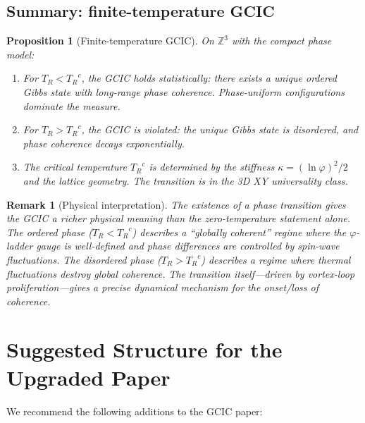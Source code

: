 \documentclass[11pt]{article}
\newtheorem{proposition}{Proposition}
\newtheorem{remark}{Remark}
\theoremstyle{definition}
\newcommand{\TR}{{T_R}}
\newcommand{\phig}{\varphi}
\begin{document}
\subsection{Summary: finite-temperature GCIC}

\begin{proposition}[Finite-temperature GCIC]
\label{prop:ft-gcic}
On $\mathbb{Z}^3$ with the compact phase model:
\begin{enumerate}[nosep]
\item For $\TR < \TR^c$, the GCIC holds \emph{statistically}: there exists a unique ordered Gibbs state with long-range phase coherence. Phase-uniform configurations dominate the measure.
\item For $\TR > \TR^c$, the GCIC is \emph{violated}: the unique Gibbs state is disordered, and phase coherence decays exponentially.
\item The critical temperature $\TR^c$ is determined by the stiffness $\kappa = (\ln\phig)^2/2$ and the lattice geometry. The transition is in the 3D XY universality class.
\end{enumerate}
\end{proposition}

\begin{remark}[Physical interpretation]
The existence of a phase transition gives the GCIC a richer physical meaning than the zero-temperature statement alone. The ordered phase ($\TR < \TR^c$) describes a ``globally coherent'' regime where the $\phig$-ladder gauge is well-defined and phase differences are controlled by spin-wave fluctuations. The disordered phase ($\TR > \TR^c$) describes a regime where thermal fluctuations destroy global coherence. The transition itself---driven by vortex-loop proliferation---gives a precise dynamical mechanism for the onset/loss of coherence.
\end{remark}


\section{Suggested Structure for the Upgraded Paper}
\label{sec:structure}

We recommend the following additions to the GCIC paper:
\end{document}
